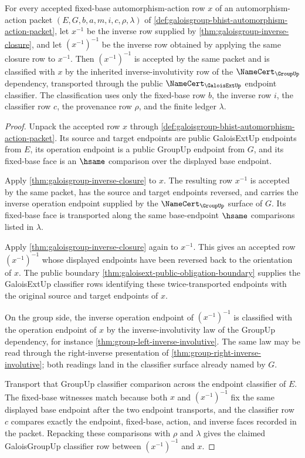 \begin{theorem}
\label{thm:galoisgroup-inverse-involution-row}
For every accepted fixed-base automorphism-action row $x$ of an
automorphism-action packet
$(E,G,b,a,m,i,c,\rho,\lambda)$ of
\autoref{def:galoisgroup-bhist-automorphism-action-packet}, let $x^{-1}$ be the
inverse row supplied by \autoref{thm:galoisgroup-inverse-closure}, and let
$(x^{-1})^{-1}$ be the inverse row obtained by applying the same closure row to
$x^{-1}$. Then $(x^{-1})^{-1}$ is accepted by the same packet and is classified
with $x$ by the inherited inverse-involutivity row of the
$\NameCert_{\GroupUp}$ dependency, transported through the public
$\NameCert_{\GaloisExtUp}$ endpoint classifier. The classification uses only
the fixed-base row $b$, the inverse row $i$, the classifier row $c$, the
provenance row $\rho$, and the finite ledger $\lambda$.
\end{theorem}
\begin{proof}
Unpack the accepted row $x$ through
\autoref{def:galoisgroup-bhist-automorphism-action-packet}. Its source and
target endpoints are public GaloisExtUp endpoints from $E$, its operation
endpoint is a public GroupUp endpoint from $G$, and its fixed-base face is an
$\hsame$ comparison over the displayed base endpoint.

Apply \autoref{thm:galoisgroup-inverse-closure} to $x$. The resulting row
$x^{-1}$ is accepted by the same packet, has the source and target endpoints
reversed, and carries the inverse operation endpoint supplied by the
$\NameCert_{\GroupUp}$ surface of $G$. Its fixed-base face is transported along
the same base-endpoint $\hsame$ comparisons listed in $\lambda$.

Apply \autoref{thm:galoisgroup-inverse-closure} again to $x^{-1}$. This gives
an accepted row $(x^{-1})^{-1}$ whose displayed endpoints have been reversed
back to the orientation of $x$. The public boundary
\autoref{thm:galoisext-public-obligation-boundary} supplies the GaloisExtUp
classifier rows identifying these twice-transported endpoints with the original
source and target endpoints of $x$.

On the group side, the inverse operation endpoint of $(x^{-1})^{-1}$ is
classified with the operation endpoint of $x$ by the inverse-involutivity law
of the GroupUp dependency, for instance
\autoref{thm:group-left-inverse-involutive}. The same law may be read through
the right-inverse presentation of \autoref{thm:group-right-inverse-involutive};
both readings land in the classifier surface already named by $G$.

Transport that GroupUp classifier comparison across the endpoint classifier of
$E$. The fixed-base witnesses match because both $x$ and $(x^{-1})^{-1}$ fix
the same displayed base endpoint after the two endpoint transports, and the
classifier row $c$ compares exactly the endpoint, fixed-base, action, and
inverse faces recorded in the packet. Repacking these comparisons with
$\rho$ and $\lambda$ gives the claimed GaloisGroupUp classifier row between
$(x^{-1})^{-1}$ and $x$.
\end{proof}

